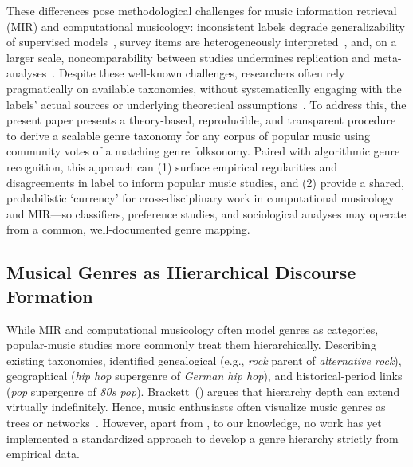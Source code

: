 \documentclass{article}
\begin{document}
These differences pose methodological challenges for music information retrieval (MIR) and computational musicology: inconsistent labels degrade generalizability of supervised models~\citep{bogdanovAcousticbrainzGenreDataset2019}, survey items are heterogeneously interpreted~\citep{langeCategorizingMusicGenres2025}, and, on a larger scale, noncomparability between studies undermines replication and meta-analyses~\citep{sturmReviewValidityIts2023}. Despite these well-known challenges, researchers often rely pragmatically on available taxonomies, without systematically engaging with the labels' actual sources or underlying theoretical assumptions~\citep{greenCriticalSurveyResearch2024}. To address this, the present paper presents a theory-based, reproducible, and transparent procedure to derive a scalable genre taxonomy for any corpus of popular music using community votes of a matching genre folksonomy. Paired with algorithmic genre recognition, this approach can (1) surface empirical regularities and disagreements in label to inform popular music studies, and (2) provide a shared, probabilistic `currency' for cross‑disciplinary work in computational musicology and MIR—so classifiers, preference studies, and sociological analyses may operate from a common, well‑documented genre mapping.

\subsection{Musical Genres as Hierarchical Discourse Formation}
While MIR and computational musicology often model genres as categories, popular-music studies more commonly treat them hierarchically. Describing existing taxonomies, \cite{pachetTaxonomyMusicalGenres2000} identified genealogical (e.g., \textit{rock} parent of \textit{alternative rock}), geographical (\textit{hip hop} supergenre of \textit{German hip hop}), and historical-period links (\textit{pop} supergenre of \textit{80s pop}). Brackett~(\citeyear[p. 8]{brackettCategorizingSoundGenre2016}) argues that hierarchy depth can extend virtually indefinitely. Hence, music enthusiasts often visualize music genres as trees or networks~\citep{musicmap}. However, apart from \cite{schreiberImprovingGenreAnnotations2015}, to our knowledge, no work has yet implemented a standardized approach to develop a genre hierarchy strictly from empirical data.
\end{document}
